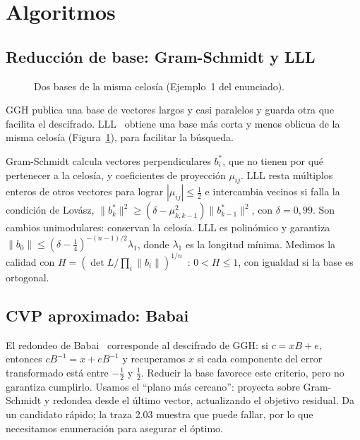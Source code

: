 \section{Algoritmos}
\subsection{Reducción de base: Gram-Schmidt y LLL}
\begin{figure}
\vspace{-12pt}
\centering

\caption{Dos bases de la misma celosía (Ejemplo~1 del enunciado).}
\label{fig:celosia}
\vspace{-6pt}
\end{figure}
GGH publica una base de vectores largos y casi paralelos y guarda otra que facilita el descifrado.
LLL~\cite{lll,galbraith} obtiene una base más corta y menos oblicua de la misma celosía
(Figura~\ref{fig:celosia}), para facilitar la búsqueda.

Gram-Schmidt calcula vectores perpendiculares $b_i^*$, que no tienen por qué pertenecer a la
celosía, y coeficientes de proyección $\mu_{ij}$. LLL resta múltiplos enteros de otros vectores
para lograr $|\mu_{ij}|\le\frac12$ e intercambia vecinos si falla la condición de Lovász,
$\|b_k^*\|^2\ge(\delta-\mu_{k,k-1}^2)\|b_{k-1}^*\|^2$, con $\delta=0{,}99$.
Son cambios unimodulares: conservan la celosía. LLL es polinómico y garantiza
$\|b_0\|\le(\delta-\frac14)^{-(n-1)/2}\lambda_1$, donde $\lambda_1$ es la longitud mínima.
Medimos la calidad con $H=(\det L/\prod_i\|b_i\|)^{1/n}$~\cite{galbraith}: $0<H\le1$, con
igualdad si la base es ortogonal.

\subsection{CVP aproximado: Babai}
El redondeo de Babai~\cite{babai} corresponde al descifrado de GGH: si $c=xB+e$, entonces
$cB^{-1}=x+eB^{-1}$ y recuperamos $x$ si cada componente del error transformado está entre
$-\frac12$ y $\frac12$. Reducir la base favorece este criterio, pero no garantiza cumplirlo.
Usamos el ``plano más cercano'': proyecta sobre Gram-Schmidt y redondea desde el último vector,
actualizando el objetivo residual. Da un candidato rápido; la traza 2.03 muestra que puede fallar,
por lo que necesitamos enumeración para asegurar el óptimo.

